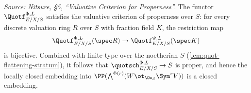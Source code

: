 \begin{lemma}
  \label{lem:quot-properness}
  \textit{Source: Nitsure, §5, ``Valuative Criterion for Properness''.}
  The functor $\Quotf_{E/X/S}^{\Phi,L}$ satisfies the valuative criterion of
  properness over $S$: for every discrete valuation ring $R$ over $S$ with
  fraction field $K$, the restriction map
  \[
    \Quotf_{E/X/S}^{\Phi,L}(\spec R) \to \Quotf_{E/X/S}^{\Phi,L}(\spec K)
  \]
  is bijective. Combined with finite type over the noetherian $S$
  (\cref{lem:quot-flattening-stratum}), it follows that
  $\quotsch_{E/X/S}^{\Phi,L} \to S$ is proper, and hence the locally closed
  embedding into $\PP(\bigwedge^{\Phi(r)}(W \ot_{\Oo_S}\Sym^r V))$ is a closed
  embedding.
\end{lemma}

